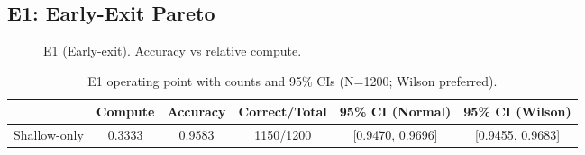 \subsection{E1: Early-Exit Pareto}
\begin{figure}[H]
  \centering
  \begin{adjustbox}{width=\linewidth}
  \end{adjustbox}
  \caption{E1 (Early-exit). Accuracy vs relative compute.}
  \label{fig:e1}
\end{figure}

\begin{table}[H]
  \centering
  \caption{E1 operating point with counts and 95\% CIs (N=1200; Wilson preferred).}
  \vspace{0.25em}
  \begin{adjustbox}{width=\linewidth}
  \begin{tabular}{l c c c c c}
    \toprule
    & Compute & Accuracy & Correct/Total & 95\% CI (Normal) & 95\% CI (Wilson) \\
    \midrule
    Shallow-only & 0.3333 & 0.9583 & 1150/1200 & [0.9470, 0.9696] & [0.9455, 0.9683] \\
    \bottomrule
  \end{tabular}
  \end{adjustbox}
\end{table}


